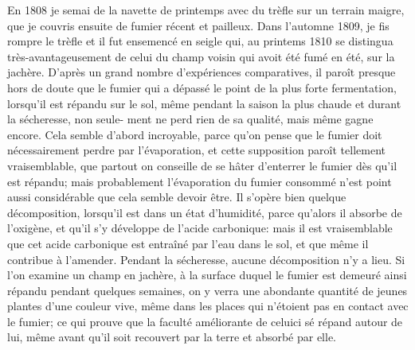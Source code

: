 En 1808 je semai de la navette de printemps avec du trèfle sur un terrain maigre, que je couvris ensuite de fumier récent et pailleux. Dans l'automne 1809, je fis rompre le trèfle et il fut ensemencé en seigle qui, au printems 1810 se distingua très-avantageusement de celui du champ voisin qui avoit été fumé en été, sur la jachère.
D'après un grand nombre d'expériences comparatives, il paroît presque hors de doute que le fumier qui a dépassé le point de la plus forte fermentation, lorsqu'il est répandu sur le sol, même pendant la saison la plus chaude et durant la sécheresse, non seule-\setcounter{page}{314} ment ne perd rien de sa qualité, mais même gagne encore. Cela semble d'abord incroyable, parce qu'on pense que le fumier doit nécessairement perdre par l'évaporation, et cette supposition paroît tellement vraisemblable, que partout on conseille de se hâter d'enterrer le fumier dès qu'il est répandu; mais probablement l'évaporation du fumier consommé n'est point aussi considérable que cela semble devoir être. Il s'opère bien quelque décomposition, lorsqu'il est dans un état d'humidité, parce qu'alors il absorbe de l'oxigène, et qu'il s'y développe de l'acide carbonique: mais il est vraisemblable que cet acide carbonique est entraîné par l'eau dans le sol, et que même il contribue à l'amender. Pendant la sécheresse, aucune décomposition n'y a lieu. Si l'on examine un champ en jachère, à la surface duquel le fumier est demeuré ainsi répandu pendant quelques semaines, on y verra une abondante quantité de jeunes plantes d'une couleur vive, même dans les places qui n'étoient pas en contact avec le fumier; ce qui prouve que la faculté améliorante de celuici sé répand autour de lui, même avant qu'il soit recouvert par la terre et absorbé par elle.
